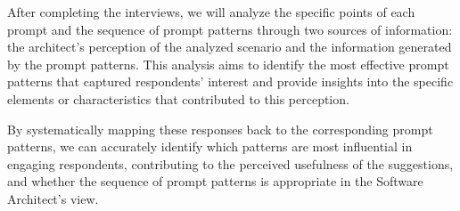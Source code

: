 
After completing the interviews, we will analyze the specific points of each prompt and the sequence of prompt patterns through two sources of information: the architect's perception of the analyzed scenario and the information generated by the prompt patterns. This analysis aims to identify the most effective prompt patterns that captured respondents' interest and provide insights into the specific elements or characteristics that contributed to this perception. 

By systematically mapping these responses back to the corresponding prompt patterns, we can accurately identify which patterns are most influential in engaging respondents, contributing to the perceived usefulness of the suggestions, and whether the sequence of prompt patterns is appropriate in the Software Architect's view. 






